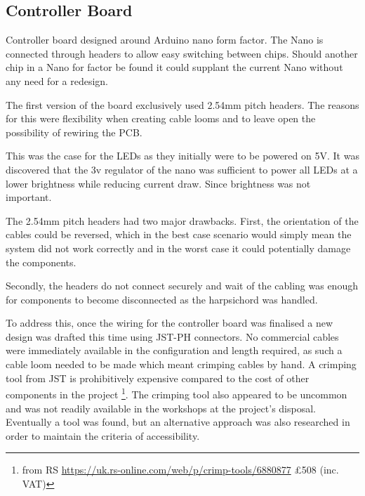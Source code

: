 


\subsection{Controller Board}\label{controller-board}

Controller board designed around Arduino nano form factor. The Nano is
connected through headers to allow easy switching between chips. Should
another chip in a Nano for factor be found it could supplant the current
Nano without any need for a redesign.

The first version of the board exclusively used 2.54mm pitch headers.
The reasons for this were flexibility when creating cable looms and to
leave open the possibility of rewiring the PCB.

This was the case for the LEDs as they initially were to be powered on
5V. It was discovered that the 3v regulator of the nano was sufficient
to power all LEDs at a lower brightness while reducing current draw.
Since brightness was not important.

The 2.54mm pitch headers had two major drawbacks. First, the orientation
of the cables could be reversed, which in the best case scenario would
simply mean the system did not work correctly and in the worst case it
could potentially damage the components.

Secondly, the headers do not connect securely and wait of the cabling
was enough for components to become disconnected as the harpsichord was
handled.

To address this, once the wiring for the controller board was finalised
a new design was drafted this time using JST-PH connectors. No
commercial cables were immediately available in the configuration and
length required, as such a cable loom needed to be made which meant
crimping cables by hand. A crimping tool from JST is prohibitively
expensive compared to the cost of other components in the project
\footnote{from RS \url{https://uk.rs-online.com/web/p/crimp-tools/6880877}
£508 (inc. VAT)}. The crimping tool also appeared to be uncommon and was
not readily available in the workshops at the project's disposal.
Eventually a tool was found, but an alternative approach was also
researched in order to maintain the criteria of accessibility.

